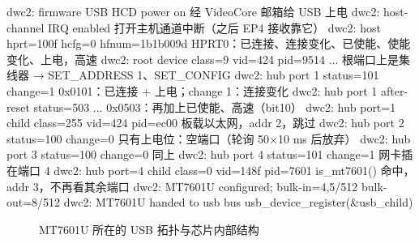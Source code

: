 \begin{txtcode}
dwc2: firmware USB HCD power on                 经 VideoCore 邮箱给 USB 上电
dwc2: host-channel IRQ enabled                  打开主机通道中断（之后 EP4 接收靠它）
dwc2: host hprt=100f hcfg=0 hfnum=1b1b009d      HPRT0：已连接、连接变化、已使能、使能变化、上电，高速
dwc2: root device class=9 vid=424 pid=9514 ...  根端口上是集线器 → SET_ADDRESS 1、SET_CONFIG
dwc2: hub port 1 status=101 change=1            0x0101：已连接 + 上电；change 1：连接变化
dwc2: hub port 1 after-reset status=503 ...     0x0503：再加上已使能、高速（bit10）
dwc2: hub port=1 child class=255 vid=424 pid=ec00   板载以太网，addr 2，跳过
dwc2: hub port 2 status=100 change=0            只有上电位：空端口（轮询 50×10 ms 后放弃）
dwc2: hub port 3 status=100 change=0            同上
dwc2: hub port 4 status=101 change=1            网卡插在端口 4
dwc2: hub port=4 child class=0 vid=148f pid=7601    is_mt7601() 命中，addr 3，不再看其余端口
dwc2: MT7601U configured; bulk-in=4,5/512 bulk-out=8/512
dwc2: MT7601U handed to usb bus                 usb_device_register(&usb_child)
\end{txtcode}

\begin{figure}[htbp]
  \centering
  \caption{MT7601U 所在的 USB 拓扑与芯片内部结构}
  \label{fig:mt7601u-topo}
\end{figure}

